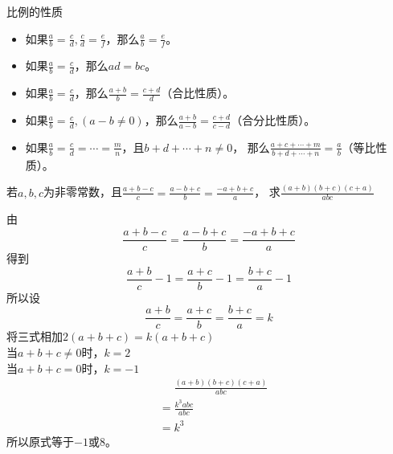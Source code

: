 \documentclass[windows,csize4]{BHCexam}
\begin{document}
\begin{groups}
    比例的性质
    \begin{itemize}
        \item 如果$\frac{a}{b}=\frac{c}{d}, \frac{c}{d}=\frac{e}{f}$，那么$\frac{a}{b}=\frac{e}{f}$。
        \item 如果$\frac{a}{b}=\frac{c}{d}$，那么$ad=bc$。
        \item 如果$\frac{a}{b}=\frac{c}{d}$，那么$\frac{a+b}{b}=\frac{c+d}{d}$（合比性质）。
        \item 如果$\frac{a}{b}=\frac{c}{d},(a-b\neq 0)$，那么$\frac{a+b}{a-b}=\frac{c+d}{c-d}$（合分比性质）。
        \item 如果$\frac{a}{b}=\frac{c}{d}=\cdots =\frac{m}{n}$，且$b+d+\cdots +n\neq 0$，
              那么$\frac{a+c+\cdots +m}{b+d+\cdots +n}=\frac{a}{b}$（等比性质）。
    \end{itemize}



    \begin{questions}[]

        \question[5] 若$a,b,c$为非零常数，且$\frac{a+b-c}{c}=\frac{a-b+c}{b}=\frac{-a+b+c}{a}$，
        求$\frac{(a+b)(b+c)(c+a)}{abc}$
        \begin{solution}{0.5cm}
            \methodonly 由
            \[
                \frac{a+b-c}{c}=\frac{a-b+c}{b}=\frac{-a+b+c}{a}
            \]
            得到
            \[
                \frac{a+b}{c}-1=\frac{a+c}{b}-1=\frac{b+c}{a}-1
            \]
            所以设
            \[
                \frac{a+b}{c}=\frac{a+c}{b}=\frac{b+c}{a}=k
            \]
            将三式相加$2(a+b+c)=k(a+b+c)$ \\
            当$a+b+c\neq 0$时，$k=2$\\
            当$a+b+c=0$时，$k=-1$\\
            \[
                \begin{aligned}
                     & \phantom{=} \frac{(a+b)(b+c)(c+a)}{abc} \\
                     & = \frac{k^3 abc}{abc}                   \\
                     & = k^3
                \end{aligned}
            \]
            所以原式等于$-1$或$8$。
        \end{solution}
        \vspace{4.5cm}


\end{questions}
\end{groups}
\end{document}
